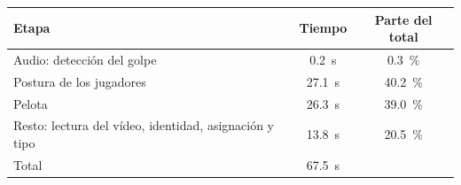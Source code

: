 \begin{tabular}{lcc}
\toprule
\textbf{Etapa} & \textbf{Tiempo} & \textbf{Parte del total} \\
\midrule
Audio: detección del golpe & \SI{0.2}{\second} & \SI{0.3}{\percent} \\
Postura de los jugadores & \SI{27.1}{\second} & \SI{40.2}{\percent} \\
Pelota & \SI{26.3}{\second} & \SI{39.0}{\percent} \\
Resto: lectura del vídeo, identidad, asignación y tipo & \SI{13.8}{\second} & \SI{20.5}{\percent} \\
\midrule
Total & \SI{67.5}{\second} &  \\
\bottomrule
\end{tabular}
